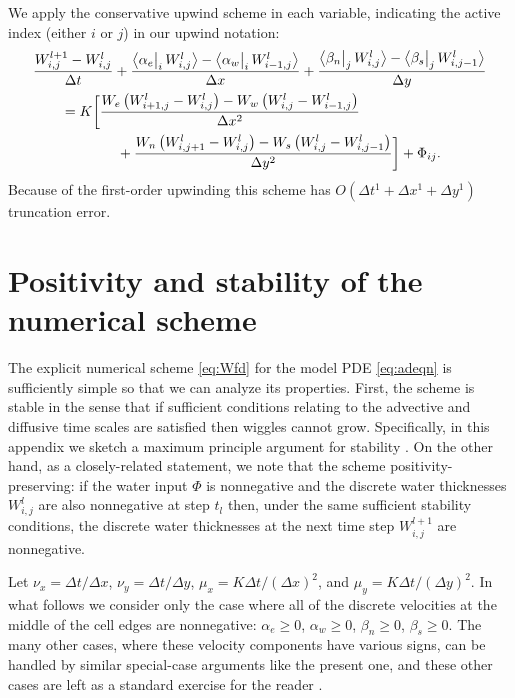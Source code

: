 \documentclass[12pt,final]{amsart}%
\newcommand{\Wlij}{W^l_{i,j}}
\newcommand{\upp}[3]{\big<#1\big|_{#3}\,#2\big>}
\begin{document}
We apply the conservative upwind scheme in each variable, indicating the active index (either $i$ or $j$) in our upwind notation:
\begin{align}
 &\frac{W_{i,j}^{l+1} - \Wlij}{\Delta t} + \frac{\upp{\alpha_e}{\Wlij}{i} - \upp{\alpha_w}{W_{i-1,j}^l}{i}}{\Delta x} + \frac{\upp{\beta_n}{\Wlij}{j} - \upp{\beta_s}{W_{i,j-1}^l}{j}}{\Delta y}  \label{eq:Wfd} \\
      &\qquad = K \bigg[\frac{W_e \left(W_{i+1,j}^l - \Wlij\right) - W_w \left(\Wlij - W_{i-1,j}^l\right)}{\Delta x^2}  \notag \\
      &\qquad\qquad\qquad + \frac{W_n \left(W_{i,j+1}^l - \Wlij\right) - W_s \left(\Wlij - W_{i,j-1}^l\right)}{\Delta y^2}\bigg] + \Phi_{ij}. \notag
\end{align}
Because of the first-order upwinding this scheme has $O(\Delta t^1 + \Delta x^1 + \Delta y^1)$ truncation error.




\small


\appendix

\section{Positivity and stability of the numerical scheme}

The explicit numerical scheme \eqref{eq:Wfd} for the model PDE \eqref{eq:adeqn} is sufficiently simple so that we can analyze its properties.  First, the scheme is stable in the sense that if sufficient conditions relating to the advective and diffusive time scales are satisfied then wiggles cannot grow.  Specifically, in this appendix we sketch a maximum principle argument for stability \citep{MortonMayers}.  On the other hand, as a closely-related statement, we note that the scheme positivity-preserving: if the water input $\Phi$ is nonnegative and the discrete water thicknesses $\Wlij$ are also nonnegative at step $t_l$ then, under the same sufficient stability conditions, the discrete water thicknesses at the next time step $W_{i,j}^{l+1}$ are nonnegative.

Let $\nu_x = \Delta t/\Delta x$, $\nu_y = \Delta t/\Delta y$, $\mu_x = K \Delta t / (\Delta x)^2$, and $\mu_y = K \Delta t / (\Delta y)^2$.  In what follows we consider only the case where all of the discrete velocities at the middle of the cell edges are nonnegative: $\alpha_e\ge 0$, $\alpha_w\ge 0$, $\beta_n\ge 0$, $\beta_s\ge 0$.  The many other cases, where these velocity components have various signs, can be handled by similar special-case arguments like the present one, and these other cases are left as a standard exercise for the reader \citep{MortonMayers}.
\end{document}
